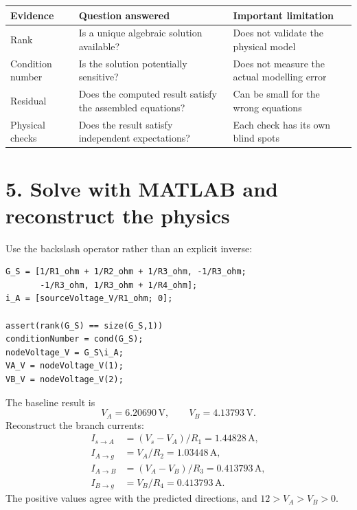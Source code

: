 \documentclass[11pt,a4paper]{article}
\begin{document}
\begin{center}
\small
\begin{tabular}{>{\raggedright\arraybackslash}p{.22\linewidth}>{\raggedright\arraybackslash}p{.34\linewidth}>{\raggedright\arraybackslash}p{.34\linewidth}}
\toprule
\textbf{Evidence} & \textbf{Question answered} & \textbf{Important limitation}\\ \midrule
Rank & Is a unique algebraic solution available? & Does not validate the physical model\\
Condition number & Is the solution potentially sensitive? & Does not measure the actual modelling error\\
Residual & Does the computed result satisfy the assembled equations? & Can be small for the wrong equations\\
Physical checks & Does the result satisfy independent expectations? & Each check has its own blind spots\\ \bottomrule
\end{tabular}
\end{center}

\section*{5. Solve with MATLAB and reconstruct the physics}
Use the backslash operator rather than an explicit inverse:
\begin{lstlisting}[style=matlabstyle,caption={Nodal-analysis system and solution}]
G_S = [1/R1_ohm + 1/R2_ohm + 1/R3_ohm, -1/R3_ohm;
       -1/R3_ohm, 1/R3_ohm + 1/R4_ohm];
i_A = [sourceVoltage_V/R1_ohm; 0];

assert(rank(G_S) == size(G_S,1))
conditionNumber = cond(G_S);
nodeVoltage_V = G_S\i_A;
VA_V = nodeVoltage_V(1);
VB_V = nodeVoltage_V(2);
\end{lstlisting}
The baseline result is
\begin{equation}
  V_A=6.20690\,\mathrm{V}, \qquad V_B=4.13793\,\mathrm{V}.
\end{equation}
Reconstruct the branch currents:
\begin{align}
 I_{s\to A}&=(V_s-V_A)/R_1=1.44828\,\mathrm{A},\\
 I_{A\to g}&=V_A/R_2=1.03448\,\mathrm{A},\\
 I_{A\to B}&=(V_A-V_B)/R_3=0.413793\,\mathrm{A},\\
 I_{B\to g}&=V_B/R_4=0.413793\,\mathrm{A}.
\end{align}
The positive values agree with the predicted directions, and $12>V_A>V_B>0$.
\end{document}
